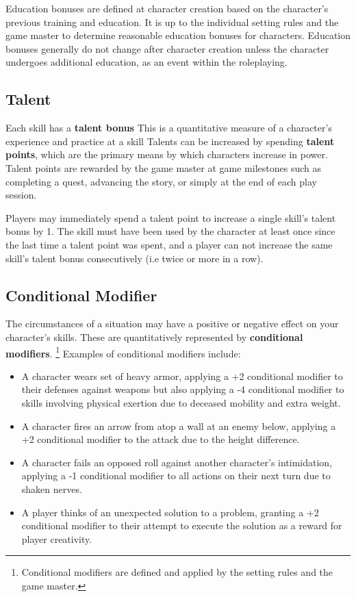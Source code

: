\documentclass[11pt]{article}
\begin{document}
Education bonuses are defined at character creation based on the character's previous training and education.
It is up to the individual setting rules and the game master to determine reasonable education bonuses for characters.
Education bonuses generally do not change after character creation unless the character undergoes additional education, as an event within the roleplaying.

\subsection{Talent}
Each skill has a \textbf{talent bonus}
This is a quantitative measure of a character's experience and practice at a skill
Talents can be increased by spending \textbf{talent points}, which are the primary means by which characters increase in power.
Talent points are rewarded by the game master at game milestones such as completing a quest, advancing the story, or simply at the end of each play session.

Players may immediately spend a talent point to increase a single skill's talent bonus by 1.
The skill must have been used by the character at least once since the last time a talent point was spent, and a player can not increase the same skill's talent bonus consecutively (i.e twice or more in a row).

\subsection{Conditional Modifier}
The circumstances of a situation may have a positive or negative effect on your character's skills.
These are quantitatively represented by \textbf{conditional modifiers}.
\footnote{Conditional modifiers are defined and applied by the setting rules and the game master.}
Examples of conditional modifiers include:

\begin{itemize}
	\item A character wears set of heavy armor, applying a +2 conditional modifier to their defenses against weapons but also applying a -4 conditional modifier to skills involving physical exertion due to deceased mobility and extra weight.
	\item A character fires an arrow from atop a wall at an enemy below, applying a +2 conditional modifier to the attack due to the height difference.
	\item A character fails an opposed roll against another character's intimidation, applying a -1 conditional modifier to all actions on their next turn due to shaken nerves.
	\item A player thinks of an unexpected solution to a problem, granting a +2 conditional modifier to their attempt to execute the solution as a reward for player creativity.
\end{itemize}
\end{document}
